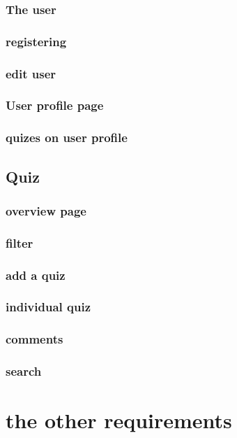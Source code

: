 \documentclass[11pt, oneside]{article}   	%
\begin{document}
\subsubsection{The user}

\subsubsection{registering}

\subsubsection{edit user}

\subsubsection{User profile page}

\subsubsection{quizes on user profile}


\subsection{Quiz}
\subsubsection{ overview page}
\subsubsection{filter}
\subsubsection{add a quiz}
\subsubsection{ individual quiz}
\subsubsection{comments}
\subsubsection{search}


\section{the other requirements} %
\end{document}
